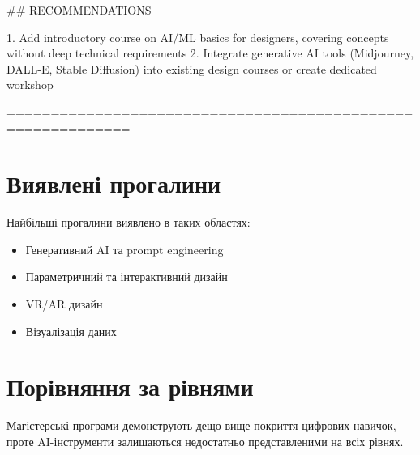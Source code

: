 \#\# RECOMMENDATIONS

1. Add introductory course on AI/ML basics for designers, covering concepts without deep technical requirements
2. Integrate generative AI tools (Midjourney, DALL-E, Stable Diffusion) into existing design courses or create dedicated workshop

============================================================

\section{Виявлені прогалини}

Найбільші прогалини виявлено в таких областях:
\begin{itemize}
    \item Генеративний AI та prompt engineering
    \item Параметричний та інтерактивний дизайн
    \item VR/AR дизайн
    \item Візуалізація даних
\end{itemize}

\section{Порівняння за рівнями}

Магістерські програми демонструють дещо вище покриття цифрових навичок,
проте AI-інструменти залишаються недостатньо представленими на всіх рівнях.
